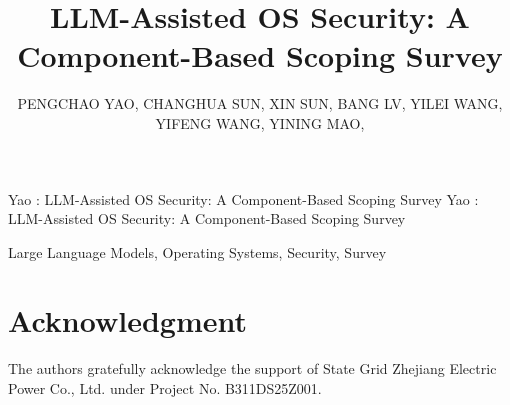 \documentclass{ieeeaccess}
\newif\ifshowrevisions
\DeclareRobustCommand{\revise}[1]{\ifshowrevisions{\sethlcolor{yellow}\hl{#1}}\else#1\fi}
\begin{document}

\title{\revise{LLM-Assisted OS Security: A Component-Based Scoping Survey}}

\author{\uppercase{Pengchao Yao},
\uppercase{Changhua Sun},
\uppercase{Xin Sun},
\uppercase{Bang Lv},
\uppercase{Yilei Wang},
\uppercase{Yifeng Wang},
\uppercase{Yining Mao},
}

\address[1]{State Grid Zhejiang Electric Power Co., Ltd. Research Institute, Hangzhou, China (e-mails: pcyao@zju.edu.cn, sun\_changhua@zj.sgcc.com.cn, sun\_xin@zj.sgcc.com.cn, lv\_bang@zj.sgcc.com.cn, wang\_yilei@zj.sgcc.com.cn, wang\_yifeng@zj.sgcc.com.cn, mao\_yining@zj.sgcc.com.cn)}

\markboth
{Yao \headeretal: LLM-Assisted OS Security: A Component-Based Scoping Survey}
{Yao \headeretal: LLM-Assisted OS Security: A Component-Based Scoping Survey}


\begin{abstract}

\end{abstract}

\begin{keywords}
Large Language Models, Operating Systems, Security, Survey
\end{keywords}


\titlepgskip=-15pt

\maketitle

%
%






% 

\section*{Acknowledgment}
The authors gratefully acknowledge the support of State Grid Zhejiang Electric Power Co., Ltd. under Project No. B311DS25Z001.
\end{document}
